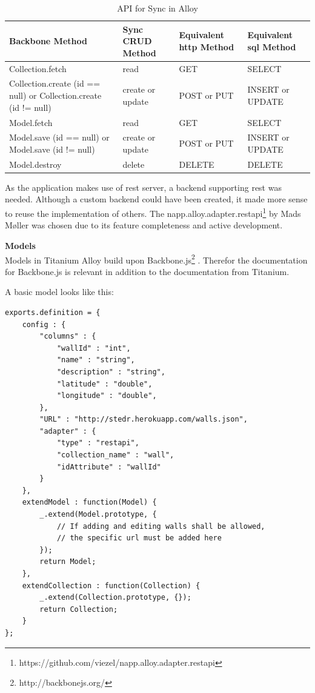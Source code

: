 \documentclass[11pt]{book}
\begin{document}
\begin{table}[H]
    \centering
    \begin{tabular}{| p{3.5cm} | p{3.5cm} | p{3.5cm} | p{2.5cm} |}
        \hline
        Backbone Method & Sync CRUD Method & Equivalent \gls{http} Method & Equivalent \gls{sql} Method\\
        \hline
        Collection.fetch & read & GET & SELECT\\
        \hline
        Collection.create (id == null) or Collection.create (id != null) & create or update & POST or PUT & INSERT or UPDATE\\
        \hline
        Model.fetch & read    & GET & SELECT\\
        \hline
        Model.save (id == null) or Model.save (id != null) & create or update & POST or PUT & INSERT or UPDATE\\
        \hline
        Model.destroy & delete & DELETE & DELETE\\
        \hline
    \end{tabular}
    \label{tab:phase_sprint2_model}
    \caption{API for Sync in Alloy\cite{titaniumAlloySync}}
\end{table}

As the application makes use of \gls{rest} server, a backend supporting \gls{rest} was needed. Although a custom backend could have been created, it made more sense to reuse the implementation of others. The napp.alloy.adapter.restapi\footnote{https://github.com/viezel/napp.alloy.adapter.restapi} by Mads Møller was chosen due to its feature completeness and active development.

\textbf{Models}\\
Models in Titanium Alloy build upon Backbone.js\footnote{http://backbonejs.org/} \cite{titaniumAlloyModel}. Therefor the documentation for Backbone.js is relevant in addition to the documentation from Titanium.

A basic model looks like this:
\begin{lstlisting}[frame=single]
exports.definition = {
    config : {
        "columns" : {
            "wallId" : "int",
            "name" : "string",
            "description" : "string",
            "latitude" : "double",
            "longitude" : "double",
        },
        "URL" : "http://stedr.herokuapp.com/walls.json",
        "adapter" : {
            "type" : "restapi",
            "collection_name" : "wall",
            "idAttribute" : "wallId"
        }
    },
    extendModel : function(Model) {
        _.extend(Model.prototype, {
            // If adding and editing walls shall be allowed,
            // the specific url must be added here
        });
        return Model;
    },
    extendCollection : function(Collection) {
        _.extend(Collection.prototype, {});
        return Collection;
    }
};
\end{lstlisting}
\end{document}
